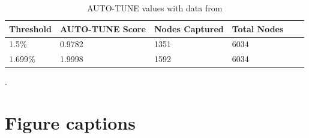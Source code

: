 \documentclass[utf8]{FrontiersinHarvard} %
\begin{document}
\begin{table}[h!]
	\centering
	\begin{tabularx}{\textwidth}{|X|X|X|X|X|X|}
		\hline
		Threshold & AUTO-TUNE Score & Nodes Captured & Total Nodes \\
		\hline
		1.5\%     & 0.9782          & 1351           & 6034        \\
		1.699\%   & 1.9998          & 1592           & 6034        \\
		\hline
	\end{tabularx}
	\caption{AUTO-TUNE values with data from \cite{rhee_national_2019}}.
	\label{table:rhee}
\end{table}

\section{Figure captions}


\end{document}
